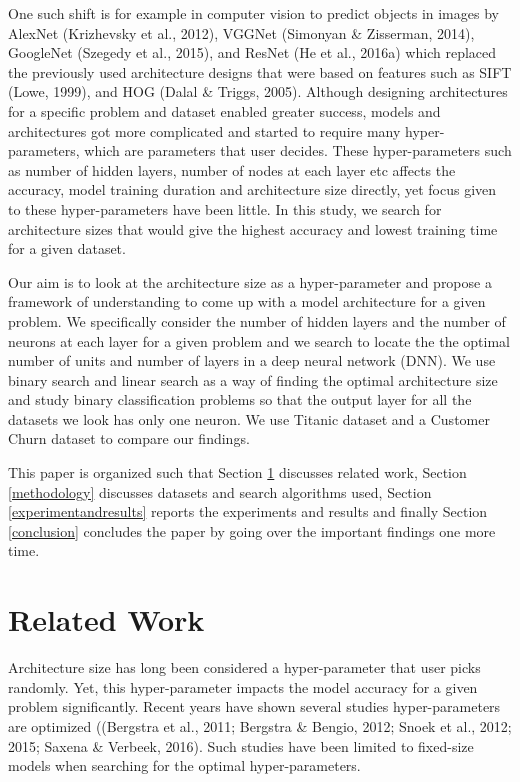 \documentclass[conference]{IEEEtran}
\begin{document}
One such shift is for example in computer vision to predict objects in images by AlexNet (Krizhevsky
et al., 2012), VGGNet (Simonyan \& Zisserman, 2014), GoogleNet (Szegedy et al., 2015), and
ResNet (He et al., 2016a) which replaced the previously used architecture designs that were based on features such as SIFT (Lowe, 1999), and HOG (Dalal \& Triggs, 2005). Although designing architectures for a specific problem and dataset enabled greater success, models and architectures got more complicated and started to require many hyper-parameters, which are parameters that user decides. These hyper-parameters such as number of hidden layers, number of nodes at each layer etc affects the accuracy, model training duration and architecture size directly, yet focus given to these hyper-parameters have been little. In this study, we search for architecture sizes that would give the highest accuracy and lowest training time for a given dataset. 

Our aim is to look at the architecture size as a hyper-parameter and propose a framework of understanding to come up with a model architecture for a given problem. We specifically consider the number of hidden layers and the number of neurons at each layer for a given problem and we search to locate the the optimal number of units and number of layers in a deep neural network (DNN). We use binary search and linear search as a way of finding the optimal architecture size and study binary classification problems so that the output layer for all the datasets we look has only one neuron. We use Titanic dataset and a Customer Churn dataset to compare our findings. 

This paper is organized such that Section \ref{relatedwork} discusses related work, Section \autoref{methodology} discusses datasets and search algorithms used, Section \autoref{experimentandresults} reports the experiments and results and finally Section \autoref{conclusion} concludes the paper by going over the important findings one more time.


\section{Related Work} \label{relatedwork}

Architecture size has long been considered a hyper-parameter that user picks randomly. Yet, this hyper-parameter impacts the model accuracy for a given problem significantly. Recent years have shown several studies hyper-parameters are optimized ((Bergstra et al., 2011; Bergstra \& Bengio, 2012; Snoek et al., 2012; 2015; Saxena \&
Verbeek, 2016). Such studies have been limited to fixed-size models when searching for the optimal hyper-parameters. 
\end{document}
